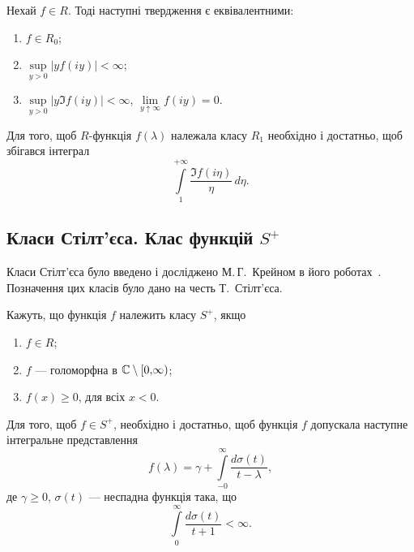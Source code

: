 \begin{theorem} \label{th-R0-n&s}
	Нехай $f\in R$. Тоді наступні твердження є еквівалентними:
	\begin{enumerate}
		\item $f\in R_0$;
		\item $\sup\limits_{y>0} |yf(iy)| < \infty$;
		\item $\sup\limits_{y>0} |y\Im f(iy)| < \infty$, $\lim\limits_{y\uparrow\infty} f(iy)=0$.
	\end{enumerate}
\end{theorem}

\begin{theorem} \label{th-R1-n&s}
	Для того, щоб $R$-функція $f(\lambda)$ належала класу $R_1$ необхідно і достатньо, щоб збігався інтеграл
	\begin{equation} \label{eq-R1-n&s}
		\int\limits_1^{+\infty} \frac{\Im f(i\eta)}{\eta}\,d\eta.
	\end{equation}
\end{theorem}



\subsection{Класи Стілт'єса. Клас функцій $S^+$}

Класи Стілт'єса було введено і досліджено М.\,Г.~Крейном в його роботах~\cite{Krein1946,Krein1951,Krein1952}. Позначення цих класів було дано на честь Т.~Стілт'єса.

\begin{definition} \label{ClassS}
	Кажуть, що функція $f$ належить класу $S^+$, якщо
	\begin{enumerate}
		\item $f\in R $;
		\item $f$ --- голоморфна в $\mathbb{C}\setminus\left[0{,}\infty\right)$;
		\item $f(x)\ge 0$, для всіх $x<0$.
	\end{enumerate}
\end{definition}

\begin{theorem}\label{th-IntS} 
	Для того, щоб $f\in S^+$, необхідно і достатньо, щоб функція $f$ допускала наступне інтегральне представлення
	\begin{equation}\label{eq-IntS}
	    f(\lambda)=\gamma + \int\limits_{-0}^{\infty} \frac{d\sigma(t)}{t-\lambda},
	\end{equation}
	де $\gamma \ge 0$, $\sigma(t)$ --- неспадна функція така, що
	\begin{equation}\label{eq-IntS-sigma}
		\int\limits_{0}^{\infty} \frac{d\sigma(t)}{t+1} < \infty .
	\end{equation}
\end{theorem}


